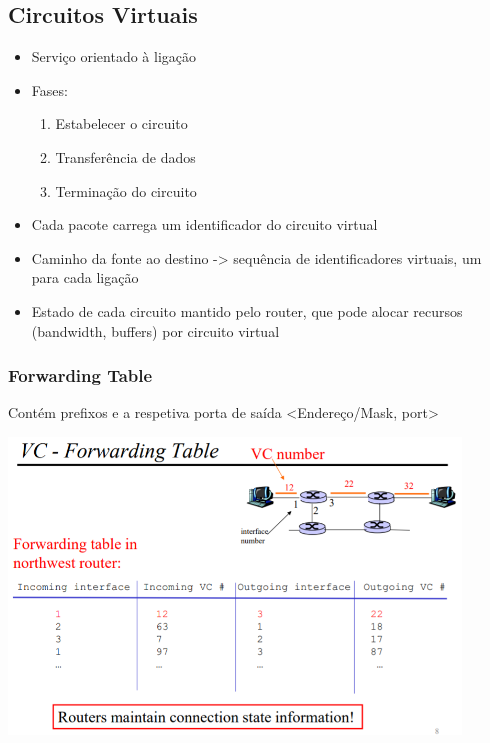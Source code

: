 \documentclass[../resumosRCOM.tex]{subfiles}
\begin{document}
\subsection{Circuitos Virtuais}
\begin{itemize}
    \item Serviço orientado à ligação
	\item Fases:
	\begin{enumerate}
	    \item Estabelecer o circuito
		\item Transferência de dados
		\item Terminação do circuito
	\end{enumerate}
	\item Cada pacote carrega um identificador do circuito virtual
    \item Caminho da fonte ao destino -> sequência de identificadores virtuais, um para cada ligação
	\item Estado de cada circuito mantido pelo router, que pode alocar recursos (bandwidth, buffers) por circuito virtual
\end{itemize}
\subsubsection{Forwarding Table}
Contém prefixos e a respetiva porta de saída <Endereço/Mask, port>
\begin{center} 
    \includegraphics[width=12cm]{images/RCOM1.png}
\end{center}
\end{document}
